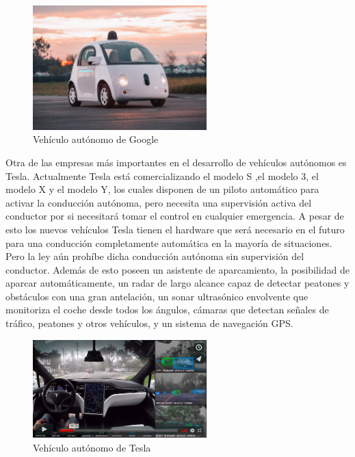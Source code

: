 \begin{figure}[H]
  \begin{center}
    \includegraphics[width=0.6\textwidth]{figures/Introduccion/google_car.jpg}
		\caption{ Vehículo autónomo de Google}
		\label{fig.google_car}
		\end{center}
\end{figure}

Otra de las empresas más importantes en el desarrollo de vehículos autónomos es Tesla. Actualmente Tesla está comercializando el modelo S ,el modelo 3, el modelo X y el modelo Y, los cuales disponen de un piloto automático para activar la conducción autónoma, pero necesita una supervisión activa del conductor por si necesitará tomar el control en cualquier emergencia. A pesar de esto los nuevos vehículos Tesla tienen el hardware que será necesario en el futuro para una conducción completamente automática en la mayoría de situaciones. Pero la ley aún prohíbe dicha conducción autónoma sin supervisión del conductor. Además de esto poseen un asistente de aparcamiento, la posibilidad de aparcar automáticamente, un radar de largo alcance capaz de detectar peatones y obstáculos con una gran antelación, un sonar ultrasónico envolvente que monitoriza el coche desde todos los ángulos, cámaras que detectan señales de tráfico, peatones y otros vehículos, y un sistema de navegación GPS.

\begin{figure}[H]
  \begin{center}
    \includegraphics[width=0.6\textwidth]{figures/Introduccion/tesla.png}
		\caption{ Vehículo autónomo de Tesla}
		\label{fig.tesla}
		\end{center}
\end{figure}

